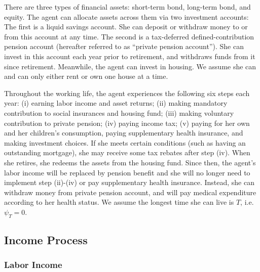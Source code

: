 \documentclass[
  12pt,
]{article}
\begin{document}
There are three types of financial assets: short-term bond, long-term
bond, and equity. The agent can allocate assets across them via two
investment accounts: The first is a liquid savings account. She can
deposit or withdraw money to or from this account at any time. The
second is a tax-deferred defined-contribution pension account (hereafter
referred to as ``private pension account''). She can invest in this
account each year prior to retirement, and withdraws funds from it since
retirement. Meanwhile, the agent can invest in housing. We assume she
can and can only either rent or own one house at a time.

Throughout the working life, the agent experiences the following six
steps each year: (i) earning labor income and asset returns; (ii) making
mandatory contribution to social insurances and housing fund; (iii)
making voluntary contribution to private pension; (iv) paying income
tax; (v) paying for her own and her children's consumption, paying
supplementary health insurance, and making investment choices. If she
meets certain conditions (such as having an outstanding mortgage), she
may receive some tax rebates after step (iv). When she retires, she
redeems the assets from the housing fund. Since then, the agent's labor
income will be replaced by pension benefit and she will no longer need
to implement step (ii)-(iv) or pay supplementary health insurance.
Instead, she can withdraw money from private pension account, and will
pay medical expenditure according to her health status. We assume the
longest time she can live is \(T\), i.e.~\(\psi_T=0\).

\hypertarget{income-process}{%
\subsection{Income Process}\label{income-process}}

\hypertarget{labor-income}{%
\subsubsection{Labor Income}\label{labor-income}}
\end{document}
